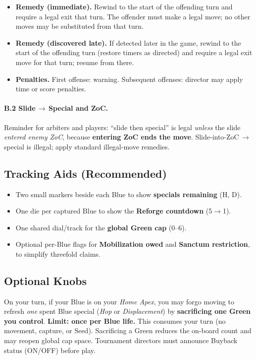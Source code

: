 \documentclass[11pt]{article}
\begin{document}
\begin{itemize}[leftmargin=1.3em,itemsep=0.2em]
  \item \textbf{Remedy (immediate).} Rewind to the start of the offending turn and require a legal exit that turn. The offender must make a legal move; no other moves may be substituted from that turn.
  \item \textbf{Remedy (discovered late).} If detected later in the game, rewind to the start of the offending turn (restore timers  as directed) and require a legal exit move for that turn; resume from there.
  \item \textbf{Penalties.} First offense: warning. Subsequent offenses: director may apply time or score penalties.
\end{itemize}

\paragraph{B.2 Slide\,$\to$\,Special and ZoC.}
Reminder for arbiters and players: ``slide then special'' is legal \emph{unless} the slide \emph{entered enemy ZoC}, because \textbf{entering ZoC ends the move}. Slide-into-ZoC\,$\to$\,special is illegal; apply standard illegal-move remedies.

\medskip
\subsection{Tracking Aids (Recommended)}

\begin{itemize}[leftmargin=1.3em,itemsep=0.2em]
  \item Two small markers beside each Blue to show \textbf{specials remaining} (H, D).
  \item One die per captured Blue to show the \textbf{Reforge countdown} (5$\to$1).
  \item One shared dial/track for the \textbf{global Green cap} (0--6).
  \item Optional per-Blue flags for \textbf{Mobilization owed} and \textbf{Sanctum restriction}, to simplify threefold claims.
\end{itemize}

\medskip
\subsection{Optional Knobs}

\begin{rulevariant}[title={Crown Buyback (Optional)}]
On your turn, if your Blue is on your \emph{Home Apex}, you may forgo moving to
refresh \emph{one} spent Blue special (\emph{Hop} or \emph{Displacement}) by
\textbf{sacrificing one Green you control}. \textbf{Limit: once per Blue life.}
This consumes your turn (no movement, capture, or Seed). Sacrificing a Green
reduces the on-board count and may reopen global cap space. Tournament directors
must announce Buyback status (ON/OFF) before play.
\end{rulevariant}
\end{document}
